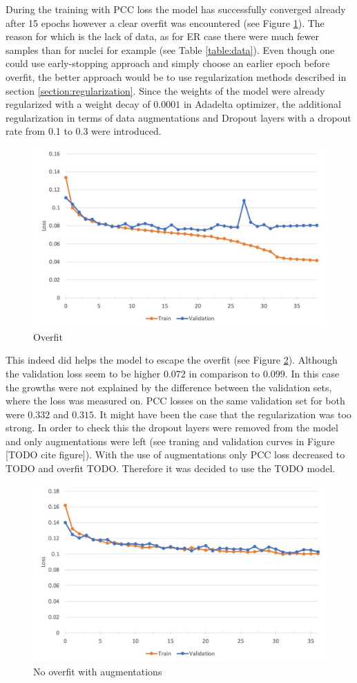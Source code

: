 During the training with PCC loss the model has successfully converged already after 15 epochs however a clear overfit was encountered (see Figure \ref{fig:actin-overfit}). The reason for which is the lack of data, as for ER case there were much fewer samples than for nuclei for example (see Table \ref{table:data}). Even though one could use early-stopping approach and simply choose an earlier epoch before overfit, the better approach would be to use regularization methods described in section \ref{section:regularization}. Since the weights of the model were already regularized with a weight decay of $0.0001$ in Adadelta optimizer, the additional regularization in terms of data augmentations and Dropout layers with a dropout rate from 0.1 to 0.3 were introduced.
\begin{figure}[H]
	\begin{center}
		\includegraphics[width=0.5\linewidth]{bilder/actin/overfit.jpg}
		\caption{Overfit}\label{fig:actin-overfit}
	\end{center}
\end{figure}

This indeed did helps the model to escape the overfit (see Figure \ref{fig:actin-no-overfit}). Although the validation loss seem to be higher $0.072$ in comparison to $0.099$. In this case the growths were not explained by the difference between the validation sets, where the loss was measured on. PCC losses on the same validation set for both were $0.332$ and $0.315$. It might have been the case that the regularization was too strong. In order to check this the dropout layers were removed from the model and only augmentations were left (see traning and validation curves in Figure [TODO cite figure]). With the use of augmentations only PCC loss decreased to TODO and overfit TODO. Therefore it was decided to use the TODO model.
\begin{figure}[H]
	\begin{center}
		\includegraphics[width=0.5\linewidth]{bilder/actin/no-overfit.jpg}
		\caption{No overfit with augmentations}\label{fig:actin-no-overfit}
	\end{center}
\end{figure}